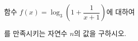 함수 $f(x)=\log_3 \left(1+\dfrac{1}{x+1}\right)$에 대하여 \par\smallskip{}\par\smallskip\noindent 를 만족시키는 자연수 $n$의 값을 구하시오.
